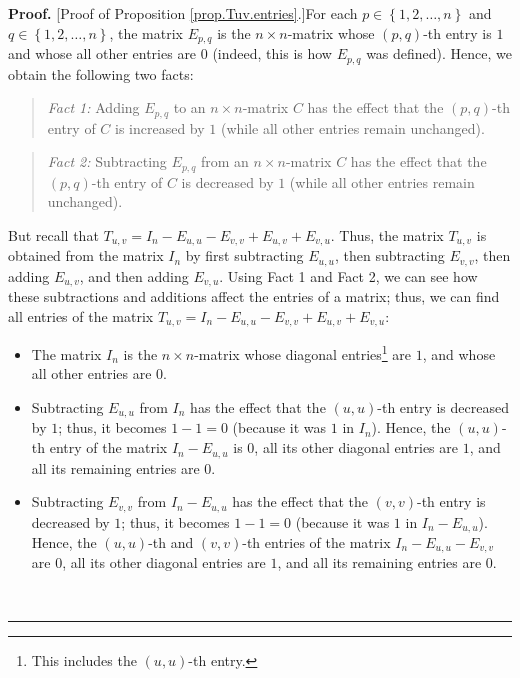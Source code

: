 \documentclass[numbers=enddot,12pt,final,onecolumn,notitlepage]{scrartcl}%
\theoremstyle{definition}
\newenvironment{statement}{\begin{quote}}{\end{quote}}
\newenvironment{proof}[1][Proof]{\noindent\textbf{#1.} }{\ \rule{0.5em}{0.5em}}
\begin{document}
\begin{proof}
[Proof of Proposition \ref{prop.Tuv.entries}.]For each $p\in\left\{
1,2,\ldots,n\right\}  $ and $q\in\left\{  1,2,\ldots,n\right\}  $, the matrix
$E_{p,q}$ is the $n\times n$-matrix whose $\left(  p,q\right)  $-th entry is
$1$ and whose all other entries are $0$ (indeed, this is how $E_{p,q}$ was
defined). Hence, we obtain the following two facts:

\begin{statement}
\textit{Fact 1:} Adding $E_{p,q}$ to an $n\times n$-matrix $C$ has the effect
that the $\left(  p,q\right)  $-th entry of $C$ is increased by $1$ (while all
other entries remain unchanged).
\end{statement}

\begin{statement}
\textit{Fact 2:} Subtracting $E_{p,q}$ from an $n\times n$-matrix $C$ has the
effect that the $\left(  p,q\right)  $-th entry of $C$ is decreased by $1$
(while all other entries remain unchanged).
\end{statement}

But recall that $T_{u,v}=I_{n}-E_{u,u}-E_{v,v}+E_{u,v}+E_{v,u}$. Thus, the
matrix $T_{u,v}$ is obtained from the matrix $I_{n}$ by first subtracting
$E_{u,u}$, then subtracting $E_{v,v}$, then adding $E_{u,v}$, and then adding
$E_{v,u}$. Using Fact 1 and Fact 2, we can see how these subtractions and
additions affect the entries of a matrix; thus, we can find all entries of the
matrix $T_{u,v}=I_{n}-E_{u,u}-E_{v,v}+E_{u,v}+E_{v,u}$:

\begin{itemize}
\item The matrix $I_{n}$ is the $n\times n$-matrix whose diagonal
entries\footnote{This includes the $\left(  u,u\right)  $-th entry.} are $1$,
and whose all other entries are $0$.

\item Subtracting $E_{u,u}$ from $I_{n}$ has the effect that the $\left(
u,u\right)  $-th entry is decreased by $1$; thus, it becomes $1-1=0$ (because
it was $1$ in $I_{n}$). Hence, the $\left(  u,u\right)  $-th entry of the
matrix $I_{n}-E_{u,u}$ is $0$, all its other diagonal entries are $1$, and all
its remaining entries are $0$.

\item Subtracting $E_{v,v}$ from $I_{n}-E_{u,u}$ has the effect that the
$\left(  v,v\right)  $-th entry is decreased by $1$; thus, it becomes $1-1=0$
(because it was $1$ in $I_{n}-E_{u,u}$). Hence, the $\left(  u,u\right)  $-th
and $\left(  v,v\right)  $-th entries of the matrix $I_{n}-E_{u,u}-E_{v,v}$
are $0$, all its other diagonal entries are $1$, and all its remaining entries
are $0$.


\end{itemize}
\end{proof}
\end{document}
